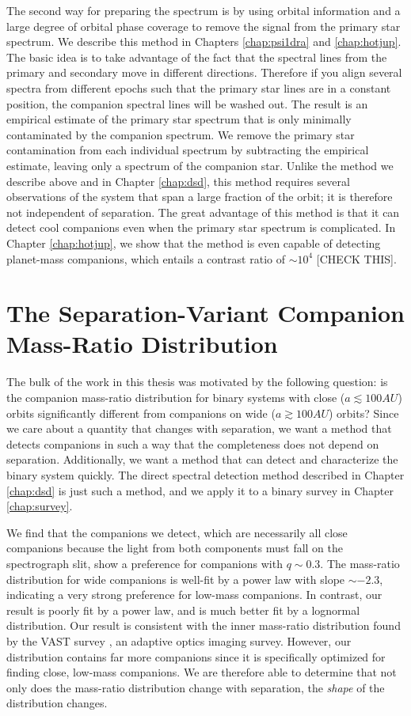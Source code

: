 \documentclass{utthesis}
\begin{document}
The second way for preparing the spectrum is by using orbital information and a large degree of orbital phase coverage to remove the signal from the primary star spectrum. We describe this method in Chapters \ref{chap:psi1dra} and \ref{chap:hotjup}. The basic idea is to take advantage of the fact that the spectral lines from the primary and secondary move in different directions. Therefore if you align several spectra from different epochs such that the primary star lines are in a constant position, the companion spectral lines will be washed out. The result is an empirical estimate of the primary star spectrum that is only minimally contaminated by the companion spectrum. We remove the primary star contamination from each individual spectrum by subtracting the empirical estimate, leaving only a spectrum of the companion star. Unlike the method we describe above and in Chapter \ref{chap:dsd}, this method requires several observations of the system that span a large fraction of the orbit; it is therefore not independent of separation. The great advantage of this method is that it can detect cool companions even when the primary star spectrum is complicated. In Chapter \ref{chap:hotjup}, we show that the method is even capable of detecting planet-mass companions, which entails a contrast ratio of $\sim 10^4$ [CHECK THIS].

\section{The Separation-Variant Companion Mass-Ratio Distribution}

The bulk of the work in this thesis was motivated by the following question: is the companion mass-ratio distribution for binary systems with close ($a \lesssim 100 AU$) orbits significantly different from companions on wide ($a \gtrsim 100 AU$) orbits? Since we care about a quantity that changes with separation, we want a method that detects companions in such a way that the completeness does not depend on separation. Additionally, we want a method that can detect and characterize the binary system quickly. The direct spectral detection method described in Chapter \ref{chap:dsd} is just such a method, and we apply it to a binary survey in Chapter \ref{chap:survey}.

We find that the companions we detect, which are necessarily all close companions because the light from both components must fall on the spectrograph slit, show a preference for companions with $q \sim 0.3$. The mass-ratio distribution for wide companions is well-fit by a power law with slope $\sim -2.3$, indicating a very strong preference for low-mass companions. In contrast, our result is poorly fit by a power law, and is much better fit by a lognormal distribution. Our result is consistent with the inner mass-ratio distribution found by the VAST survey \citep{DeRosa2014}, an adaptive optics imaging survey. However, our distribution contains far more companions since it is specifically optimized for finding close, low-mass companions. We are therefore able to determine that not only does the mass-ratio distribution change with separation, the \emph{shape} of the distribution changes.
\end{document}

